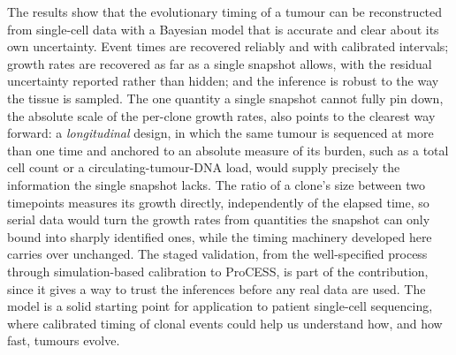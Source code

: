 The results show that the evolutionary timing of a tumour can be reconstructed from
single-cell data with a Bayesian model that is accurate and clear about its own
uncertainty. Event times are recovered reliably and with calibrated intervals;
growth rates are recovered as far as a single snapshot allows, with the residual
uncertainty reported rather than hidden; and the inference is robust to the way the
tissue is sampled. The one quantity a single snapshot cannot fully pin down, the
absolute scale of the per-clone growth rates, also points to the clearest way
forward: a \emph{longitudinal} design, in which the same tumour is sequenced at more
than one time and anchored to an absolute measure of its burden, such as a total cell
count or a circulating-tumour-DNA load, would supply precisely the information the
single snapshot lacks. The ratio of a clone's size between two timepoints measures its
growth directly, independently of the elapsed time, so serial data would turn the
growth rates from quantities the snapshot can only bound into sharply identified ones,
while the timing machinery developed here carries over unchanged. The staged
validation, from the well-specified process through
simulation-based calibration to ProCESS, is part of the contribution, since it
gives a way to trust the inferences before any real data are used. The model is a
solid starting point for application to patient single-cell sequencing, where
calibrated timing of clonal events could help us understand how, and how fast,
tumours evolve.
